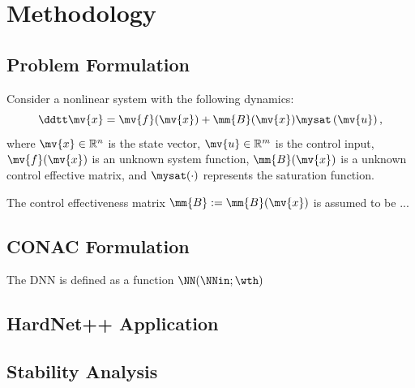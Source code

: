 \chapter{Methodology}

\section{Problem Formulation}

Consider a nonlinear system with the following dynamics:
\begin{equation}
  \label{eq:system_dynamics}
  \ddtt\mv{x}
  =
  \mv{f}(\mv{x})
  +
  \mm{B}(\mv{x})
  \mysat
  \left(
    \mv{u}
  \right)
  ,
\end{equation}
where $\mv{x} \in \mathbb{R}^{n}$ is the state vector, $\mv{u} \in \mathbb{R}^{m}$ is the control input, $\mv{f}(\mv{x})$ is an unknown system function, $\mm{B}(\mv{x})$ is a unknown control effective matrix, and $\mysat(\cdot)$ represents the saturation function.

The control effectiveness matrix $\mm{B}:=\mm{B}(\mv{x})$ is assumed to be ...



\section{CONAC Formulation}

The DNN is defined as a function $\NN(\NNin;\wth)$

\section{HardNet++ Application}

\section{Stability Analysis}



